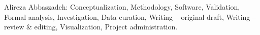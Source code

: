 Alireza Abbaszadeh: Conceptualization, Methodology, Software, Validation, Formal analysis, Investigation, Data curation, Writing -- original draft, Writing -- review \& editing, Visualization, Project administration.
